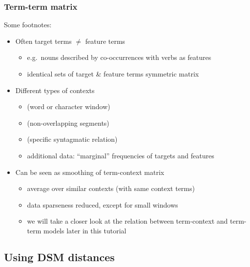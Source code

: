 \documentclass[t]{beamer} %
\begin{document}
\begin{frame}
  \frametitle{Term-term matrix}

  Some footnotes:
  \begin{itemize}
  \item Often target terms $\neq$ feature terms
    \begin{itemize}
    \item e.g.\ nouns described by co-occurrences with verbs as features
    \item identical sets of target \& feature terms \so symmetric matrix
    \end{itemize}
  \item Different types of contexts \citep{Evert:08}
    \begin{itemize}
    \item {} (word or character window)
    \item {} (non-overlapping segments)
    \item {} (specific syntagmatic relation)
    \item additional data: ``marginal'' frequencies of targets and features
    \end{itemize}
  \item Can be seen as smoothing of term-context matrix
    \begin{itemize}
    \item average over similar contexts (with same context terms)
    \item data sparseness reduced, except for small windows
    \item we will take a closer look at the relation between term-context and term-term models later in this tutorial
    \end{itemize}
  \end{itemize}
\end{frame}

\subsection{Using DSM distances}
\end{document}
